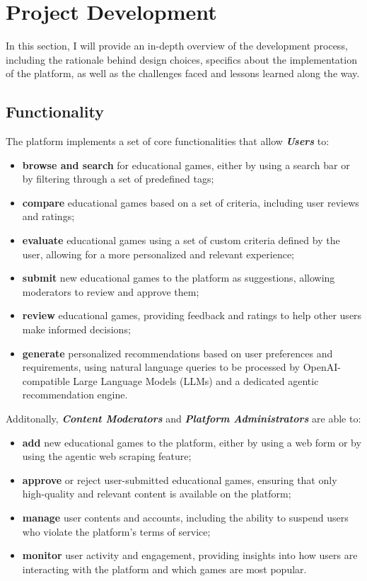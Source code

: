 \documentclass[11pt,italian,a4paper]{article}
\begin{document}
\section{Project Development}

In this section, I will provide an in-depth overview of the development process, including the rationale behind design choices, specifics about the implementation of the platform, as well as the challenges faced and lessons learned along the way.

\subsection{Functionality}

The platform implements a set of core functionalities that allow \textbf{\textit{Users}} to:
\begin{itemize}
    \item \textbf{browse and search} for educational games, either by using a search bar or by filtering through a set of predefined tags;
    \item \textbf{compare} educational games based on a set of criteria, including user reviews and ratings;
    \item \textbf{evaluate} educational games using a set of custom criteria defined by the user, allowing for a more personalized and relevant experience;
    \item \textbf{submit} new educational games to the platform as suggestions, allowing moderators to review and approve them;
    \item \textbf{review} educational games, providing feedback and ratings to help other users make informed decisions;
    \item \textbf{generate} personalized recommendations based on user preferences and requirements, using natural language queries to be processed by OpenAI-compatible Large Language Models (LLMs) and a dedicated agentic recommendation engine.
\end{itemize}

\noindent Additonally, \textbf{\textit{Content Moderators}} and \textbf{\textit{Platform Administrators}} are able to:
\begin{itemize}
    \item \textbf{add} new educational games to the platform, either by using a web form or by using the agentic web scraping feature;
    \item \textbf{approve} or reject user-submitted educational games, ensuring that only high-quality and relevant content is available on the platform;
    \item \textbf{manage} user contents and accounts, including the ability to suspend users who violate the platform's terms of service;
    \item \textbf{monitor} user activity and engagement, providing insights into how users are interacting with the platform and which games are most popular.
\end{itemize}
\end{document}
